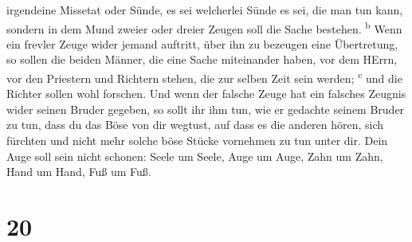 irgendeine Missetat oder Sünde, es sei welcherlei Sünde es sei, die man
tun kann, sondern in dem Mund zweier oder dreier Zeugen soll die Sache
bestehen. \textsuperscript{b}  Wenn ein frevler Zeuge
wider jemand auftritt, über ihn zu bezeugen eine Übertretung,
 so sollen die beiden Männer, die eine Sache miteinander
haben, vor dem HErrn, vor den Priestern und Richtern stehen, die zur
selben Zeit sein werden; \textsuperscript{c}  und die
Richter sollen wohl forschen. Und wenn der falsche Zeuge hat ein
falsches Zeugnis wider seinen Bruder gegeben,  so sollt
ihr ihm tun, wie er gedachte seinem Bruder zu tun, dass du das Böse von
dir wegtust,  auf dass es die anderen hören, sich
fürchten und nicht mehr solche böse Stücke vornehmen zu tun unter dir.
 Dein Auge soll sein nicht schonen: Seele um Seele, Auge
um Auge, Zahn um Zahn, Hand um Hand, Fuß um Fuß.

\hypertarget{section-19}{%
\section{20}\label{section-19}}

